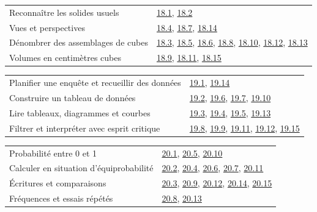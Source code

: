 \begin{tabularx}{\linewidth}{@{}Yl@{}}\toprule
Reconnaître les solides usuels & \hyperref[exo-18-1]{18.1}, \hyperref[exo-18-2]{18.2}\\[2mm]
Vues et perspectives & \hyperref[exo-18-4]{18.4}, \hyperref[exo-18-7]{18.7}, \hyperref[exo-18-14]{18.14}\\[2mm]
Dénombrer des assemblages de cubes & \hyperref[exo-18-3]{18.3}, \hyperref[exo-18-5]{18.5}, \hyperref[exo-18-6]{18.6}, \hyperref[exo-18-8]{18.8}, \hyperref[exo-18-10]{18.10}, \hyperref[exo-18-12]{18.12}, \hyperref[exo-18-13]{18.13}\\[2mm]
Volumes en centimètres cubes & \hyperref[exo-18-9]{18.9}, \hyperref[exo-18-11]{18.11}, \hyperref[exo-18-15]{18.15}\\[2mm]
\bottomrule\end{tabularx}\par\vspace{4mm}
\clearpage
{}\fontsize{10}{13}\selectfont
{}\begin{tabularx}{\linewidth}{@{}Yl@{}}\toprule
Planifier une enquête et recueillir des données & \hyperref[exo-19-1]{19.1}, \hyperref[exo-19-14]{19.14}\\[2mm]
Construire un tableau de données & \hyperref[exo-19-2]{19.2}, \hyperref[exo-19-6]{19.6}, \hyperref[exo-19-7]{19.7}, \hyperref[exo-19-10]{19.10}\\[2mm]
Lire tableaux, diagrammes et courbes & \hyperref[exo-19-3]{19.3}, \hyperref[exo-19-4]{19.4}, \hyperref[exo-19-5]{19.5}, \hyperref[exo-19-13]{19.13}\\[2mm]
Filtrer et interpréter avec esprit critique & \hyperref[exo-19-8]{19.8}, \hyperref[exo-19-9]{19.9}, \hyperref[exo-19-11]{19.11}, \hyperref[exo-19-12]{19.12}, \hyperref[exo-19-15]{19.15}\\[2mm]
\bottomrule\end{tabularx}\par\vspace{4mm}
\begin{tabularx}{\linewidth}{@{}Yl@{}}\toprule
Probabilité entre 0 et 1 & \hyperref[exo-20-1]{20.1}, \hyperref[exo-20-5]{20.5}, \hyperref[exo-20-10]{20.10}\\[2mm]
Calculer en situation d’équiprobabilité & \hyperref[exo-20-2]{20.2}, \hyperref[exo-20-4]{20.4}, \hyperref[exo-20-6]{20.6}, \hyperref[exo-20-7]{20.7}, \hyperref[exo-20-11]{20.11}\\[2mm]
Écritures et comparaisons & \hyperref[exo-20-3]{20.3}, \hyperref[exo-20-9]{20.9}, \hyperref[exo-20-12]{20.12}, \hyperref[exo-20-14]{20.14}, \hyperref[exo-20-15]{20.15}\\[2mm]
Fréquences et essais répétés & \hyperref[exo-20-8]{20.8}, \hyperref[exo-20-13]{20.13}\\[2mm]
\bottomrule\end{tabularx}\par\vspace{4mm}
